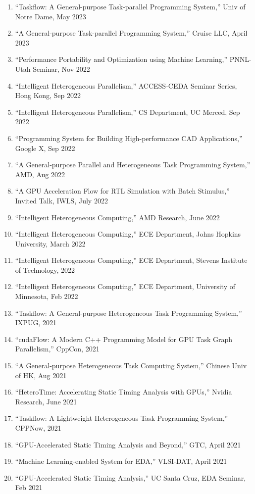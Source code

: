 \documentclass[A4,11pt]{article}
\begin{document}
\begin{enumerate}
  \item ``Taskflow: A General-purpose Task-parallel Programming System,'' Univ of Notre Dame, May 2023
  \item ``A General-purpose Task-parallel Programming System,'' Cruise LLC, April 2023
  \item ``Performance Portability and Optimization using Machine Learning,'' PNNL-Utah Seminar, Nov 2022
  \item ``Intelligent Heterogeneous Parallelism,'' ACCESS-CEDA Seminar Series, Hong Kong, Sep 2022
  \item ``Intelligent Heterogeneous Parallelism,'' CS Department, UC Merced, Sep 2022
  \item ``Programming System for Building High-performance CAD Applications,'' Google X, Sep 2022
  \item ``A General-purpose Parallel and Heterogeneous Task Programming System,'' AMD, Aug 2022
  \item ``A GPU Acceleration Flow for RTL Simulation with Batch Stimulus,'' Invited Talk, IWLS, July 2022
  \item ``Intelligent Heterogeneous Computing,'' AMD Research, June 2022
  \item ``Intelligent Heterogeneous Computing,'' ECE Department, Johns Hopkins University, March 2022
  \item ``Intelligent Heterogeneous Computing,'' ECE Department, Stevens Institute of Technology, 2022
  \item ``Intelligent Heterogeneous Computing,'' ECE Department, University of Minnesota, Feb 2022
  \item ``Taskflow: A General-purpose Heterogeneous Task Programming System,'' IXPUG, 2021
  \item ``cudaFlow: A Modern C++ Programming Model for GPU Task Graph Parallelism,'' CppCon, 2021
  \item ``A General-purpose Heterogeneous Task Computing System,'' Chinese Univ of HK, Aug 2021
  \item ``HeteroTime: Accelerating Static Timing Analysis with GPUs,'' Nvidia Research, June 2021
  \item ``Taskflow: A Lightweight Heterogeneous Task Programming System,'' CPPNow, 2021
  \item ``GPU-Accelerated Static Timing Analysis and Beyond,'' GTC, April 2021
  \item ``Machine Learning-enabled System for EDA,'' VLSI-DAT, April 2021
  \item ``GPU-Accelerated Static Timing Analysis,'' UC Santa Cruz, EDA Seminar, Feb 2021 

\end{enumerate}
\end{document}

